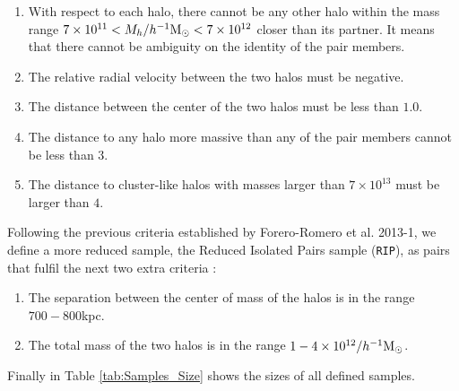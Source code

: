 \documentclass[usenatbib]{latex/mn2e}
\begin{document}
\begin{enumerate}

\item{With respect to each halo, there cannot be any other halo within the 
mass range $7\times10^{11} < M_{h}/\hMsun < 7\times 10^{12}$ closer than 
its partner. It means that there cannot be ambiguity on the identity of
the pair members.}

\item{The relative radial velocity between the two halos must be 
negative.}

\item{The distance between the center of the two halos must be less than 
$1.0$\hMpc.}

\item{The distance to any halo more massive than any of the pair members 
cannot be less than $3$\hMpc.}

\item{The distance to cluster-like halos with masses larger than 
$7\times10^{13}$ \hMsun must be larger than $4$\hMpc.}
\end{enumerate}



Following the previous criteria established by Forero-Romero et al. 2013-1,
we define a more reduced sample, the Reduced Isolated Pairs sample 
(\texttt{RIP}), as pairs that fulfil the next two extra criteria :



\begin{enumerate}

\item{The separation between the center of mass of the halos is in the 
range $700-800$kpc.}

\item{The total mass of the two halos is in the range 
$1-4\times 10^{12}/\hMsun$.}

\end{enumerate}



Finally in Table \ref{tab:Samples_Size} shows the sizes of all defined 
samples. 
\end{document}
